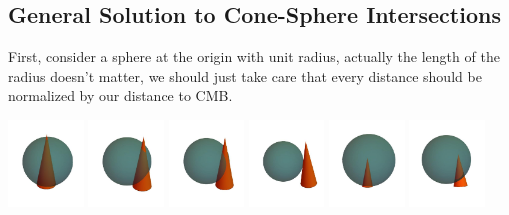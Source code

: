 \documentclass{article}
\begin{document}
\begin{multicols}{2}
\subsection{General Solution to Cone-Sphere Intersections}
First, consider a sphere at the origin with unit radius, actually the length of the radius doesn't matter, we should just take care that every distance should be normalized by our distance to CMB.

\hspace{-0.5cm}\includegraphics[width=0.15\textwidth]{I1.jpg}
\hspace{-0.5cm}\includegraphics[width=0.15\textwidth]{I3.jpg}
\hspace{-0.5cm}\includegraphics[width=0.15\textwidth]{I4.jpg}
\includegraphics[width=0.15\textwidth]{I5.jpg}
\includegraphics[width=0.15\textwidth]{I6.jpg}
\includegraphics[width=0.15\textwidth]{I8.jpg}
\label{fig:fig1}
\medskip


\end{multicols}
\end{document}
